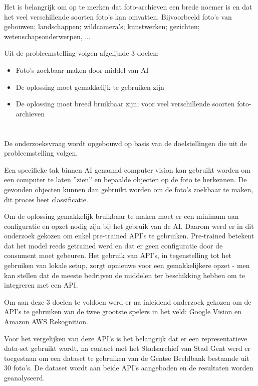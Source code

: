Het is belangrijk om op te merken dat foto-archieven een brede noemer is en dat het veel verschillende soorten foto's kan omvatten. Bijvoorbeeld foto's van gebouwen; landschappen; wildcamera's; kunstwerken; gezichten; wetenschapsonderwerpen, ...

Uit de probleemstelling volgen afgelijnde 3 doelen:
\begin{itemize}
    \item Foto's zoekbaar maken door middel van AI
    \item De oplossing moet gemakkelijk te gebruiken zijn
    \item De oplossing moet breed bruikbaar zijn; voor veel verschillende soorten foto-archieven
\end{itemize}

\section{}
\label{sec:onderzoeksvraag}
De onderzoeksvraag wordt opgebouwd op basis van de doelstellingen die uit de probleemstelling volgen.

Een specifieke tak binnen AI genaamd computer vision kan gebruikt worden om een computer te laten ''zien'' en bepaalde objecten op de foto te herkennen. De gevonden objecten kunnen dan gebruikt worden om de foto's zoekbaar te maken, dit proces heet classificatie.

Om de oplossing gemakkelijk bruikbaar te maken moet er een minimum aan configuratie en opzet nodig zijn bij het gebruik van de AI. Daarom werd er in dit onderzoek gekozen om enkel pre-trained API's te gebruiken. Pre-trained betekent dat het model reeds getrained werd en dat er geen configuratie door de consument moet gebeuren. Het gebruik van API's, in tegenstelling tot het gebruiken van lokale setup, zorgt opnieuwe voor een gemakkelijkere opzet - men kan stellen dat de meeste bedrijven de middelen ter beschikking hebben om te integreren met een API.

Om aan deze 3 doelen te voldoen werd er na inleidend onderzoek gekozen om de API's te gebruiken van de twee grootste spelers in het veld: Google Vision en Amazon AWS Rekognition.

Voor het vergelijken van deze API's is het belangrijk dat er een representatieve data-set gebruikt wordt, na contact met het Stadsarchief van Stad Gent werd er toegestaan om een dataset te gebruiken van de Gentse Beeldbank bestaande uit 30 foto's. De dataset wordt aan beide API's aangeboden en de resultaten worden geanalyseerd.

